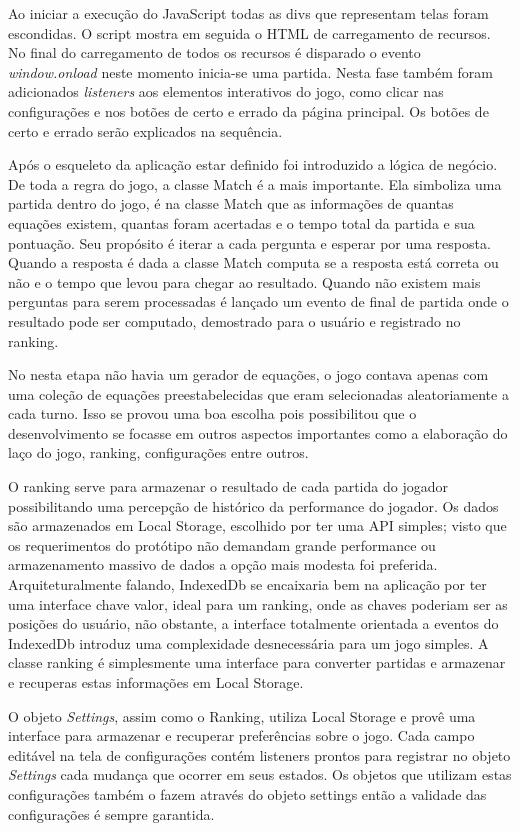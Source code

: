 \begin{draft}
Ao iniciar a execução do JavaScript todas as divs que representam
telas foram escondidas. O script mostra em seguida o HTML de
carregamento de recursos. No final do carregamento de todos os recursos
é disparado o evento \textit{window.onload} neste momento inicia-se uma
partida. Nesta fase também foram adicionados \textit{listeners} aos
elementos interativos do jogo, como clicar nas configurações e nos
botões de certo e errado da página principal.
Os botões de certo
e errado serão explicados na sequência.


Após o esqueleto da aplicação estar definido foi introduzido a lógica de negócio.
De toda a regra do jogo, a classe Match é a mais importante.
Ela simboliza uma partida dentro do jogo, é na classe Match que 
as informações de quantas equações existem, quantas foram acertadas
e o tempo total da partida e sua pontuação. Seu propósito é iterar 
a cada pergunta e esperar por uma resposta. Quando a resposta é dada
a classe Match computa se a resposta está correta ou não e o tempo 
que levou para chegar ao resultado. Quando não existem mais perguntas 
para serem processadas é lançado um evento de final de partida onde 
o resultado pode ser computado, demostrado para o usuário e registrado 
no ranking.

No nesta etapa não havia um gerador de equações, o jogo
contava apenas com uma coleção de equações preestabelecidas que eram
selecionadas aleatoriamente a cada turno. Isso se provou uma boa escolha
pois possibilitou que o desenvolvimento se focasse em outros aspectos
importantes como a elaboração do laço do jogo, ranking, configurações entre outros.

O ranking serve para armazenar o resultado de cada partida do jogador
possibilitando uma percepção de histórico da performance do jogador.
Os dados são armazenados em Local Storage, escolhido por
ter uma API simples; visto que os requerimentos do protótipo não
demandam grande performance ou armazenamento massivo de dados a opção
mais modesta foi preferida. Arquiteturalmente falando, IndexedDb se
encaixaria bem na aplicação por ter uma interface chave valor,
ideal para um ranking, onde as chaves poderiam ser as posições do usuário,
não obstante, a interface totalmente orientada a eventos do IndexedDb
introduz uma complexidade desnecessária para um jogo simples.
A classe ranking é simplesmente uma interface para converter partidas e armazenar
e recuperas estas informações em Local Storage.

O objeto \textit{Settings}, assim como o Ranking, utiliza Local Storage
e provê uma interface para armazenar e recuperar preferências sobre o jogo.
Cada campo editável na tela de configurações contém listeners prontos
para registrar no objeto \textit{Settings} cada mudança que ocorrer em seus estados.
Os objetos que utilizam estas configurações também o fazem através do objeto settings
então a validade das configurações é sempre garantida.


\end{draft}
